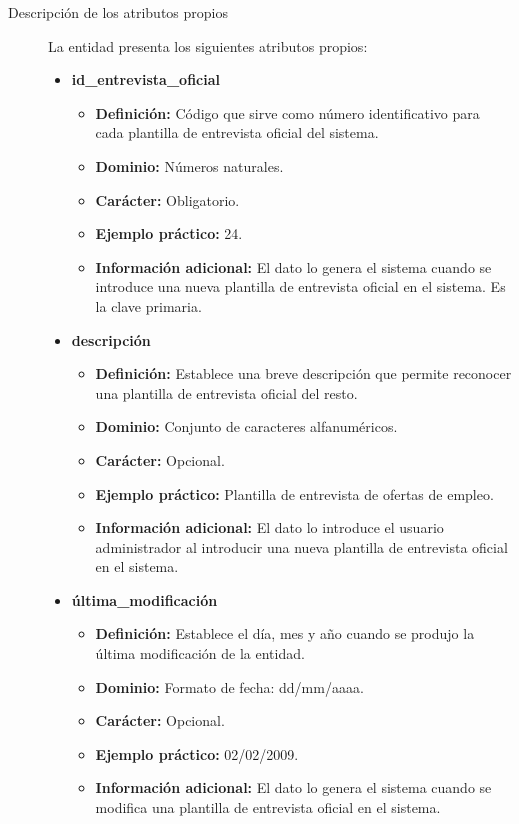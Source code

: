 \begin{description}
   \item[Descripción de los atributos propios] La entidad presenta los
   siguientes atributos propios:

   \begin{itemize}
    \item \textbf{id\_entrevista\_oficial}
      \begin{itemize}
         \item \textbf{Definición:} Código que sirve como número identificativo
               para cada plantilla de entrevista oficial del sistema.
         \item \textbf{Dominio:} Números naturales.
         \item \textbf{Carácter:} Obligatorio.
         \item \textbf{Ejemplo práctico:} 24.
         \item \textbf{Información adicional:} El dato lo genera el sistema
               cuando se introduce una nueva plantilla de entrevista oficial en
               el sistema. Es la clave primaria.
      \end{itemize}
    \item \textbf{descripción}
      \begin{itemize}
         \item \textbf{Definición:} Establece una breve descripción que permite
         reconocer una plantilla de entrevista oficial del resto.
         \item \textbf{Dominio:} Conjunto de caracteres alfanuméricos.
         \item \textbf{Carácter:} Opcional.
         \item \textbf{Ejemplo práctico:} Plantilla de entrevista de ofertas de empleo.
         \item \textbf{Información adicional:} El dato lo introduce el
         usuario administrador al introducir una nueva plantilla de entrevista
         oficial en el sistema.
      \end{itemize}
    \item \textbf{última\_modificación}
      \begin{itemize}
         \item \textbf{Definición:} Establece el día, mes y año cuando se
            produjo la última modificación de la entidad.
         \item \textbf{Dominio:} Formato de fecha: dd/mm/aaaa.
         \item \textbf{Carácter:} Opcional.
         \item \textbf{Ejemplo práctico:} 02/02/2009.
         \item \textbf{Información adicional:} El dato lo genera el sistema
               cuando se modifica una plantilla de entrevista oficial en
               el sistema.
      \end{itemize}
   \end{itemize}


\end{description}
